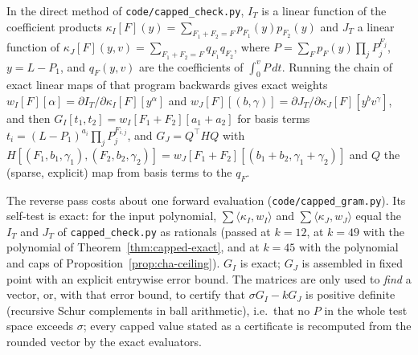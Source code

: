 \begin{proposition}\label{prop:adjoint}
In the direct method of \texttt{code/capped\_check.py}, $I_T$ is a linear
function of the coefficient products
$\kappa_I[F](y)=\sum_{F_1+F_2=F}p_{F_1}(y)p_{F_2}(y)$ and $J_T$ a linear
function of $\kappa_J[F](y,v)=\sum_{F_1+F_2=F}q_{F_1}q_{F_2}$, where
$P=\sum_Fp_F(y)\prod_jP_j^{F_j}$, $y=L-P_1$, and
$q_F(y,v)$ are the coefficients of $\int_0^vP\,dt$. Running the chain of
exact linear maps of that program backwards gives exact weights
$w_I[F][\alpha]=\partial I_T/\partial\kappa_I[F][y^\alpha]$ and
$w_J[F][(b,\gamma)]=\partial J_T/\partial\kappa_J[F][y^bv^\gamma]$, and then
$G_I[t_1,t_2]=w_I[F_1+F_2][a_1+a_2]$ for basis terms
$t_i=(L-P_1)^{a_i}\prod_jP_j^{F_{i,j}}$, and $G_J=Q^{\top}HQ$ with
$H[(F_1,b_1,\gamma_1),(F_2,b_2,\gamma_2)]=w_J[F_1+F_2][(b_1+b_2,\gamma_1+\gamma_2)]$
and $Q$ the (sparse, explicit) map from basis terms to the $q_F$.
\end{proposition}
\begin{sloppypar}
The reverse pass costs about one forward evaluation
(\texttt{code/capped\_gram.py}). Its self-test is exact: for the input
polynomial, $\sum\langle\kappa_I,w_I\rangle$ and
$\sum\langle\kappa_J,w_J\rangle$ equal the $I_T$ and $J_T$ of
\texttt{capped\_check.py} as rationals (passed at $k=12$, at $k=49$ with the
polynomial of Theorem~\ref{thm:capped-exact}, and at $k=45$ with the
polynomial and caps of Proposition~\ref{prop:cha-ceiling}). $G_I$ is exact; $G_J$ is assembled in fixed point
with an explicit entrywise error bound. The matrices are only used to
\emph{find} a vector, or, with that error bound, to certify that
$\sigma G_I-kG_J$ is positive definite (recursive Schur complements in ball
arithmetic), i.e.\ that no $P$ in the whole test space exceeds $\sigma$; every capped value stated as a
certificate is recomputed from the rounded vector by the exact evaluators.
\end{sloppypar}

